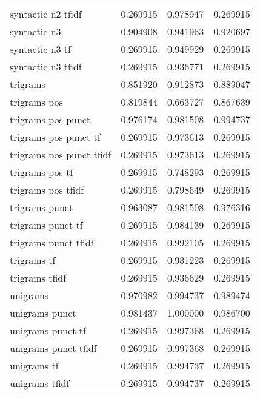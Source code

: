 \begin{tabular}{lrrr}
syntactic n2 tfidf         &  0.269915 &       0.978947 &             0.269915 \\
syntactic n3               &  0.904908 &       0.941963 &             0.920697 \\
syntactic n3 tf            &  0.269915 &       0.949929 &             0.269915 \\
syntactic n3 tfidf         &  0.269915 &       0.936771 &             0.269915 \\
trigrams                   &  0.851920 &       0.912873 &             0.889047 \\
trigrams pos               &  0.819844 &       0.663727 &             0.867639 \\
trigrams pos punct         &  0.976174 &       0.981508 &             0.994737 \\
trigrams pos punct tf      &  0.269915 &       0.973613 &             0.269915 \\
trigrams pos punct tfidf   &  0.269915 &       0.973613 &             0.269915 \\
trigrams pos tf            &  0.269915 &       0.748293 &             0.269915 \\
trigrams pos tfidf         &  0.269915 &       0.798649 &             0.269915 \\
trigrams punct             &  0.963087 &       0.981508 &             0.976316 \\
trigrams punct tf          &  0.269915 &       0.984139 &             0.269915 \\
trigrams punct tfidf       &  0.269915 &       0.992105 &             0.269915 \\
trigrams tf                &  0.269915 &       0.931223 &             0.269915 \\
trigrams tfidf             &  0.269915 &       0.936629 &             0.269915 \\
unigrams                   &  0.970982 &       0.994737 &             0.989474 \\
unigrams punct             &  0.981437 &       1.000000 &             0.986700 \\
unigrams punct tf          &  0.269915 &       0.997368 &             0.269915 \\
unigrams punct tfidf       &  0.269915 &       0.997368 &             0.269915 \\
unigrams tf                &  0.269915 &       0.994737 &             0.269915 \\
unigrams tfidf             &  0.269915 &       0.994737 &             0.269915 \\
\bottomrule
\end{tabular}
